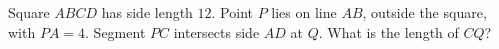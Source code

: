 Square $ABCD$ has side length $12$. Point $P$ lies on line $AB$, outside the square, with $PA=4$. Segment $PC$ intersects side $AD$ at $Q$. What is the length of $CQ$?
